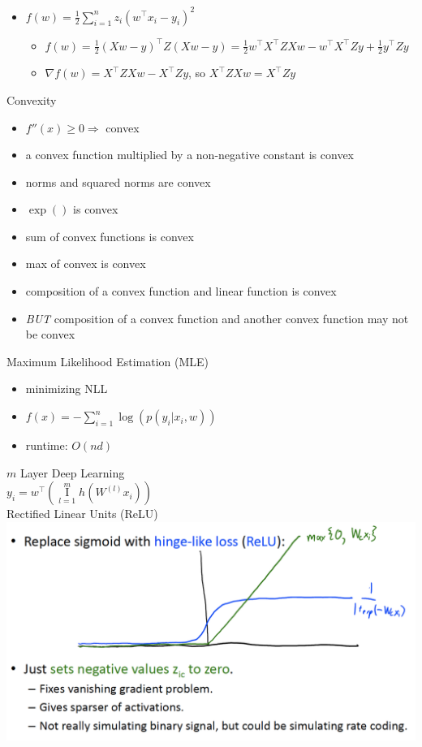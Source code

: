 \documentclass[10pt,landscape,a4paper]{article}
\DeclareMathOperator*{\composition}{I}
\begin{document}
\begin{multicols*}{5}
\begin{itemize}
\begin{itemize}
    \end{itemize}
    \item \(f(w) = \frac{1}{2} \sum\limits_{i=1}^{n} z_i (w^\intercal  x_i - y_i)^2\)
    \begin{itemize}
        \item \(f(w) = \frac{1}{2} (Xw-y)^\intercal Z (Xw-y)  = \frac{1}{2} w^\intercal X^\intercal Z X w - w^\intercal X^\intercal Z y + \frac{1}{2} y^\intercal Z y\)
        \item \(\nabla f(w) = X^\intercal Z X w - X^\intercal Z y\), so \(X^\intercal Z X w = X^\intercal Z y\)
    \end{itemize}
\end{itemize}
Convexity
\begin{itemize}
    \item \(f''(x) \geq 0 \Rightarrow \) convex
    \item a convex function multiplied by a non-negative constant is convex
    \item norms and squared norms are convex
    \item \(\exp()\) is convex
    \item sum of convex functions is convex
    \item max of convex is convex
    \item composition of a convex function and linear function is convex
    \item \emph{BUT} composition of a convex function and another convex function may not be convex
\end{itemize}
Maximum Likelihood Estimation (MLE) \\
\begin{itemize}
    \item minimizing NLL
    \item \(f(x) = - \sum_{i=1}^{n}\log{(p(y_i|x_i,w))}\)
    \item runtime: \(O(nd)\)
\end{itemize}
\(m\) Layer Deep Learning \\
$y_i = w^\intercal (\composition\limits_{l=1}^{m} h(W^{(l)} x_i))$ \\
Rectified Linear Units (ReLU) \\
\includegraphics[scale=0.15]{relu}


\end{multicols*}
\end{document}
